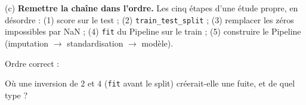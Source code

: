\documentclass[10pt,a4paper]{article}
\newcommand{\repligne}{\par\vspace{0.42cm}\noindent\dotfill}
\begin{document}
\vspace{0.25cm}
(c) \textbf{Remettre la chaîne dans l'ordre.} Les cinq étapes d'une étude propre, en désordre : \quad (1) score sur le test ; \quad (2) \texttt{train\_test\_split} ; \quad (3) remplacer les zéros impossibles par NaN ; \quad (4) \texttt{fit} du Pipeline sur le train ; \quad (5) construire le Pipeline (imputation $\to$ standardisation $\to$ modèle).

\vspace{0.2cm}
Ordre correct : \makebox[5cm]{\dotfill}

\vspace{0.2cm}
Où une inversion de $2$ et $4$ (\texttt{fit} avant le split) créerait-elle une fuite, et de quel type ?
\repligne
\repligne
\end{document}
